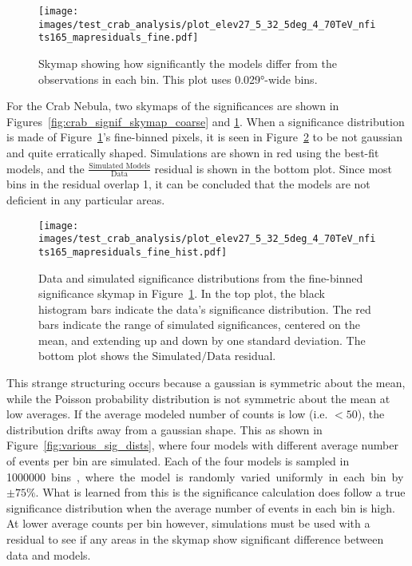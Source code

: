   \begin{figure}[b]
    \centering
    \texttt{[image: images/test\_crab\_analysis/plot\_elev27\_5\_32\_5deg\_4\_70TeV\_nfits165\_mapresiduals\_fine.pdf]}
    \caption[Crab Residual Skymap Fine Binning]{
      Skymap showing how significantly the models differ from the observations in each bin.
      This plot uses \ang{0.029}-wide bins.}
    \label{fig:crab_signif_skymap_fine}
  \end{figure}

  For the Crab Nebula, two skymaps of the significances are shown in Figures~\ref{fig:crab_signif_skymap_coarse} and \ref{fig:crab_signif_skymap_fine}.
  When a significance distribution is made of Figure~\ref{fig:crab_signif_skymap_fine}'s fine-binned pixels, it is seen in Figure~\ref{fig:crab_signif_distribution} to be not gaussian and quite erratically shaped.
  Simulations are shown in red using the best-fit models, and the $\frac{\textrm{Simulated Models}}{\textrm{Data}}$ residual is shown in the bottom plot.
  Since most bins in the residual overlap 1, it can be concluded that the models are not deficient in any particular areas.
  
  \begin{figure}[h]
    \centering
    \texttt{[image: images/test\_crab\_analysis/plot\_elev27\_5\_32\_5deg\_4\_70TeV\_nfits165\_mapresiduals\_fine\_hist.pdf]}
    \caption[Crab Residual Bin Distribution]{
      Data and simulated significance distributions from the fine-binned significance skymap in Figure~\ref{fig:crab_signif_skymap_fine}.
      In the top plot, the black histogram bars indicate the data's significance distribution.
      The red bars indicate the range of simulated significances, centered on the mean, and extending up and down by one standard deviation.
      The bottom plot shows the $\textrm{Simulated}/\textrm{Data}$ residual.
    }
    \label{fig:crab_signif_distribution}
  \end{figure}
  
  This strange structuring occurs because a gaussian is symmetric about the mean, while the Poisson probability distribution is not symmetric about the mean at low averages.
  If the average modeled number of counts is low (i.e. $<50$), the distribution drifts away from a gaussian shape.
  This as shown in Figure~\ref{fig:various_sig_dists}, where four models with different average number of events per bin are simulated.
  Each of the four models is sampled in \SI{1000000} bins, where the model is randomly varied uniformly in each bin by $\pm 75\%$.
  What is learned from this is the significance calculation does follow a true significance distribution when the average number of events in each bin is high.
  At lower average counts per bin however, simulations must be used with a residual to see if any areas in the skymap show significant difference between data and models.
  
